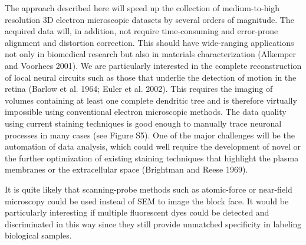 \documentclass{article}
\begin{document}
The approach described here will speed up the collection of medium-to-high resolution 3D electron microscopic datasets by several orders of magnitude. The acquired data will, in addition, not require time-consuming and error-prone alignment and distortion correction. This should have wide-ranging applications not only in biomedical research but also in materials characterization (Alkemper and Voorhees 2001). We are particularly interested in the complete reconstruction of local neural circuits such as those that underlie the detection of motion in the retina (Barlow et al. 1964; Euler et al. 2002). This requires the imaging of volumes containing at least one complete dendritic tree and is therefore virtually impossible using conventional electron microscopic methods. The data quality using current staining techniques is good enough to manually trace neuronal processes in many cases (see Figure S5). One of the major challenges will be the automation of data analysis, which could well require the development of novel or the further optimization of existing staining techniques that highlight the plasma membranes or the extracellular space (Brightman and Reese 1969).

It is quite likely that scanning-probe methods such as atomic-force or near-field microscopy could be used instead of SEM to image the block face. It would be particularly interesting if multiple fluorescent dyes could be detected and discriminated in this way since they still provide unmatched specificity in labeling biological samples.
\end{document}

